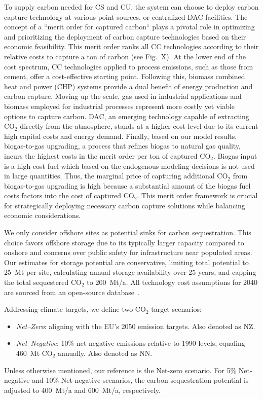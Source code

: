 \documentclass[twocolumn]{article}
\newcommand{\carbon}{CO$_2$}
\begin{document}
To supply carbon needed for CS and CU, the system can choose to deploy carbon capture technology at various point sources, or centralized DAC facilities. The concept of a ``merit order for captured carbon`` plays a pivotal role in optimizing and prioritizing the deployment of carbon capture technologies based on their economic feasibility. This merit order ranks all CC technologies according to their relative costs to capture a ton of carbon (see Fig.~X). At the lower end of the cost spectrum, CC technologies applied to process emissions, such as those from cement, offer a cost-effective starting point. Following this, biomass combined heat and power (CHP) systems provide a dual benefit of energy production and carbon capture. Moving up the scale, gas used in industrial applications and biomass employed for industrial processes represent more costly yet viable options to capture carbon. DAC, an emerging technology capable of extracting \carbon{} directly from the atmosphere, stands at a higher cost level due to its current high capital costs and energy demand. Finally, based on our model results, biogas-to-gas upgrading, a process that refines biogas to natural gas quality, incurs the highest costs in the merit order per ton of captured \carbon{}. Biogas input is a high-cost fuel which based on the endogenous modeling decisions is not used in large quantities. Thus, the marginal price of capturing additional \carbon{} from biogas-to-gas upgrading is high because a substantial amount of the biogas fuel costs factors into the cost of captured \carbon{}. This merit order framework is crucial for strategically deploying necessary carbon capture solutions while balancing economic considerations.

We only consider offshore sites as potential sinks for carbon sequestration. This choice favors offshore storage due to its typically larger capacity compared to onshore and concerns over public safety for infrastructure near populated areas. Our estimates for storage potential are conservative, limiting total potential to 25~Mt per site, calculating annual storage availability over 25 years, and capping the total sequestered \carbon{} to 200~Mt/a. All technology cost assumptions for 2040 are sourced from an open-source database~\cite{lisazeyenPyPSATechnologydataTechnology2023}.


Addressing climate targets, we define two \carbon{} target scenarios:
\begin{itemize}
    \item[] \textit{Net--Zero}: aligning with the EU's 2050 emission targets. Also denoted as NZ.
    \item[] \textit{Net--Negative}: 10\% net-negative emissions relative to 1990 levels, equaling 460~Mt \carbon{} annually. Also denoted as NN.
\end{itemize}
Unless otherwise mentioned, our reference is the Net-zero scenario. For 5\% Net-negative and 10\% Net-negative scenarios, the carbon sequestration potential is adjusted to 400~Mt/a and 600~Mt/a, respectively.
\end{document}

